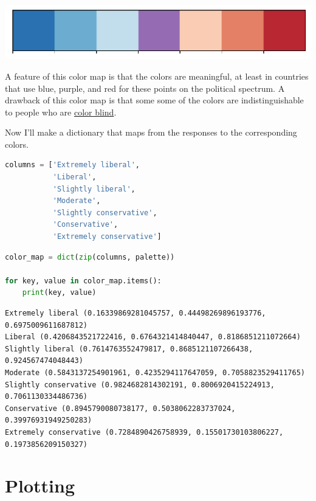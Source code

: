 \begin{center}
\includegraphics[scale=0.75]{02_polviews_files/02_polviews_78_0.pdf}
\end{center}

A feature of this color map is that the colors are meaningful, at least
in countries that use blue, purple, and red for these points on the
political spectrum. A drawback of this color map is that some some of
the colors are indistinguishable to people who are
\href{https://davidmathlogic.com/colorblind}{color blind}.

Now I'll make a dictionary that maps from the responses to the
corresponding colors.

\begin{lstlisting}[language=Python,style=source]
columns = ['Extremely liberal', 
           'Liberal', 
           'Slightly liberal', 
           'Moderate', 
           'Slightly conservative', 
           'Conservative',
           'Extremely conservative']
\end{lstlisting}

\begin{lstlisting}[language=Python,style=source]
color_map = dict(zip(columns, palette))

for key, value in color_map.items():
    print(key, value)
\end{lstlisting}

\begin{lstlisting}[style=output]
Extremely liberal (0.16339869281045757, 0.44498269896193776, 0.6975009611687812)
Liberal (0.4206843521722416, 0.6764321414840447, 0.8186851211072664)
Slightly liberal (0.7614763552479817, 0.8685121107266438, 0.924567474048443)
Moderate (0.5843137254901961, 0.4235294117647059, 0.7058823529411765)
Slightly conservative (0.9824682814302191, 0.8006920415224913, 0.7061130334486736)
Conservative (0.8945790080738177, 0.5038062283737024, 0.39976931949250283)
Extremely conservative (0.7284890426758939, 0.15501730103806227, 0.1973856209150327)
\end{lstlisting}

\hypertarget{plotting}{%
\section{Plotting}\label{plotting}}

